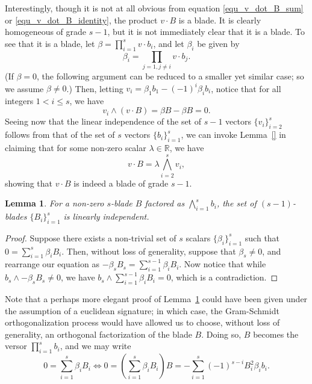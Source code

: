 \documentclass{birkjour}
\newtheorem{lem}[thm]{Lemma}
\theoremstyle{definition}
\theoremstyle{remark}
\numberwithin{equation}{section}
\newcommand{\R}{\mathbb{R}}
\begin{document}
Interestingly, though it is not at all obvious from equation \eqref{equ_v_dot_B_sum}
or \eqref{equ_v_dot_B_identity}, the product
$v\cdot B$ is a blade.  It is clearly homogeneous of grade $s-1$, but it is not
immediately clear that it is a blade.  To see that it is a blade, let $\beta=\prod_{i=1}^s v\cdot b_i$,
and let $\beta_i$ be given by
\begin{equation*}
\beta_i=\prod_{j=1,j\neq i}v\cdot b_j.
\end{equation*}
(If $\beta=0$, the following argument can be reduced to a smaller yet similar case; so
we assume $\beta\neq 0$.)
Then, letting $v_i=\beta_1b_1-(-1)^i\beta_ib_i$, notice that for all integers $1<i\leq s$,
we have
\begin{equation*}
v_i\wedge (v\cdot B)=\beta B-\beta B=0.
\end{equation*}
Seeing now that the linear independence of the set of $s-1$ vectors
$\{v_i\}_{i=2}^s$ follows from that of the set of $s$ vectors $\{b_i\}_{i=1}^s$,
we can invoke Lemma~\ref{} in claiming that for some non-zero scalar $\lambda\in\R$,
we have
\begin{equation*}
v\cdot B = \lambda\bigwedge_{i=2}^s v_i,
\end{equation*}
showing that $v\cdot B$ is indeed a blade of grade $s-1$.

\begin{lem}\label{lem_B_i_lin_indep}
For a non-zero $s$-blade $B$ factored as $\bigwedge_{i=1}^s b_i$, the set of
$(s-1)$-blades $\{B_i\}_{i=1}^s$ is linearly independent.
\end{lem}
\begin{proof}
Suppose there exists a non-trivial set of $s$ scalars $\{\beta_i\}_{i=1}^s$
such that $0 = \sum_{i=1}^s\beta_i B_i$.
Then, without loss of generality, suppose that $\beta_s\neq 0$, and rearrange
our equation as $-\beta_sB_s=\sum_{i=1}^{s-1}\beta_iB_i$.  Now notice
that while $b_s\wedge-\beta_sB_s\neq 0$, we have $b_s\wedge\sum_{i=1}^{s-1}\beta_iB_i=0$,
which is a contradiction.
\end{proof}

Note that a perhaps more elegant proof of Lemma~\ref{lem_B_i_lin_indep} could have been given
under the assumption
of a euclidean signature; in which case, the Gram-Schmidt orthogonalization process would have
allowed us to choose, without loss of generality, an orthogonal factorization of the blade $B$.
Doing so, $B$ becomes the versor $\prod_{i=1}^s b_i$, and we may write
\begin{equation*}
0 = \sum_{i=1}^s \beta_iB_i \iff
0=\left(\sum_{i=1}^s\beta_iB_i\right)B = -\sum_{i=1}^s(-1)^{s-i}B_i^2\beta_ib_i.
\end{equation*}



\begin{thebibliography}{9}

\end{thebibliography}
\end{document}
